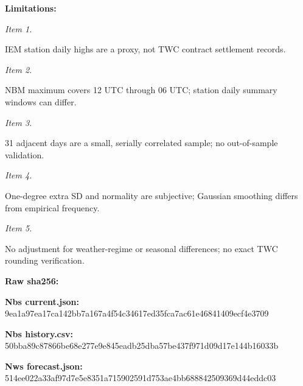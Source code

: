 \documentclass[11pt]{article}
\begin{document}
\par\noindent\textbf{Limitations:} \par \par\noindent\textit{Item 1.}\par IEM station daily highs are a proxy, not TWC contract settlement records.

\par\noindent\textit{Item 2.}\par NBM maximum covers 12 UTC through 06 UTC; station daily summary windows can differ.

\par\noindent\textit{Item 3.}\par 31 adjacent days are a small, serially correlated sample; no out-of-sample validation.

\par\noindent\textit{Item 4.}\par One-degree extra SD and normality are subjective; Gaussian smoothing differs from empirical frequency.

\par\noindent\textit{Item 5.}\par No adjustment for weather-regime or seasonal differences; no exact TWC rounding verification.

\par\noindent\textbf{Raw sha256:} \par \par\noindent\textbf{Nbs current.json:} 9ea1a97ea17c\hspace{0pt}a142bb7a167a\hspace{0pt}4f54c34617ed\hspace{0pt}35fca7ac61e4\hspace{0pt}6841409ecf4e\hspace{0pt}3709

\par\noindent\textbf{Nbs history.csv:} 50bba89c8786\hspace{0pt}6be68e277e9e\hspace{0pt}845eadb25dba\hspace{0pt}57be437f971d\hspace{0pt}09d17e144b16\hspace{0pt}033b

\par\noindent\textbf{Nws forecast.json:} 514ee022a33a\hspace{0pt}f97d7e5e8351\hspace{0pt}a715902591d7\hspace{0pt}53ae4bb68884\hspace{0pt}2509369d44ed\hspace{0pt}dc03
\end{document}
